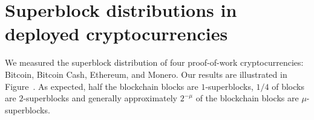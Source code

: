 \section{Superblock distributions in deployed cryptocurrencies}

We measured the superblock distribution of four proof-of-work cryptocurrencies:
Bitcoin, Bitcoin Cash, Ethereum, and Monero. Our results are illustrated in
Figure~. As expected, half the blockchain blocks are
$1$-superblocks, $1/4$ of blocks are $2$-superblocks and generally approximately
$2^{-\mu}$ of the blockchain blocks are $\mu$-superblocks.
